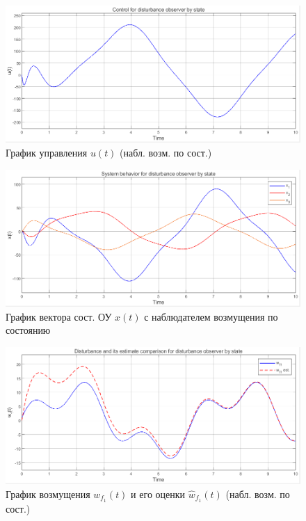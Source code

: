 \documentclass[a4paper, 12pt]{article}
\begin{document}
    \begin{figure}[H]
        \centering
        \includegraphics[scale=0.6]{3task_u1.png}
        \captionsetup{skip=0pt}
        \caption{График управления $u(t)$ (набл. возм. по сост.)}
        \label{fig:3task_u1}
    \end{figure}
    \begin{figure}[H]
        \centering
        \includegraphics[scale=0.6]{3task_x1.png}
        \captionsetup{skip=0pt}
        \caption{График вектора сост. ОУ $x(t)$ с наблюдателем возмущения по состоянию}
        \label{fig:3task_x1}
    \end{figure}
    \begin{figure}[H]
        \centering
        \includegraphics[scale=0.6]{3task_wfhwf1.png}
        \captionsetup{skip=0pt}
        \caption{График возмущения $w_{f_1}(t)$ и его оценки $\hat{w}_{f_1}(t)$ (набл. возм. по сост.)}
        \label{fig:3task_wfhwf1}
    \end{figure}
\end{document}
